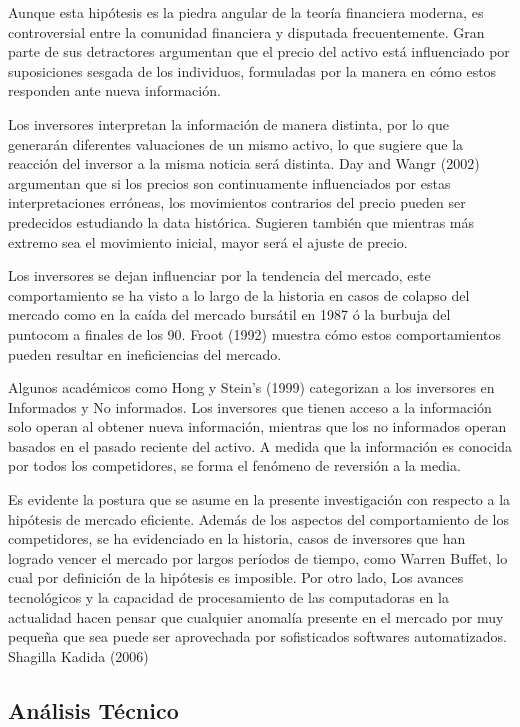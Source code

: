 \documentclass[a4paper,12pt]{Latex/Classes/PhDthesisPSnPDF}
\begin{document}
Aunque esta hipótesis es la piedra angular de la teoría financiera moderna, es controversial entre la comunidad financiera y disputada frecuentemente. Gran parte de sus detractores argumentan que el precio del activo está influenciado por suposiciones sesgada de los individuos, formuladas por la manera en cómo estos responden ante nueva información.

Los inversores interpretan la información de manera distinta, por lo que generarán diferentes valuaciones de un mismo activo, lo que sugiere que la reacción del inversor a la misma noticia será distinta. Day and Wangr (2002) argumentan que si los precios son continuamente influenciados por estas interpretaciones erróneas, los movimientos contrarios del precio pueden ser predecidos estudiando la data histórica. Sugieren también que mientras más extremo sea el movimiento inicial, mayor será el ajuste de precio.

Los inversores se dejan influenciar por la tendencia del mercado, este comportamiento se ha visto a lo largo de la historia en casos de colapso del mercado como en la caída del mercado bursátil en 1987 ó la burbuja del puntocom a finales de los 90. Froot (1992) muestra cómo estos comportamientos pueden resultar en ineficiencias del mercado.

Algunos académicos como Hong y Stein's (1999) categorizan a los inversores en Informados y No informados. Los inversores que tienen acceso a la información solo operan al obtener nueva información, mientras que los no informados operan basados en el pasado reciente del activo. A medida que la información es conocida por todos los competidores, se forma el fenómeno de reversión a la media.

Es evidente la postura que se asume en la presente investigación con respecto a la hipótesis de mercado eficiente. Además de los aspectos del comportamiento de los competidores, se ha evidenciado en la historia, casos de inversores que han logrado vencer el mercado por largos períodos de tiempo, como Warren Buffet, lo cual por definición de la hipótesis es imposible. Por otro lado, Los avances tecnológicos y la capacidad de procesamiento de las computadoras en la actualidad hacen pensar que cualquier anomalía presente en el mercado por muy pequeña que sea puede ser aprovechada por sofisticados softwares automatizados. Shagilla Kadida (2006)

\subsection{Análisis Técnico}
\end{document}
